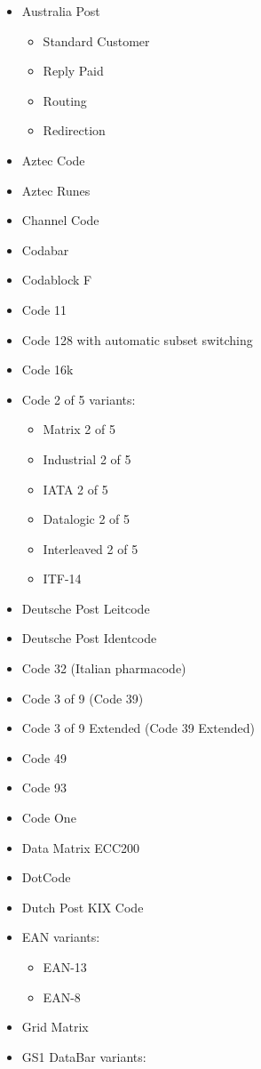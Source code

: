 \begin{itemize}
\tightlist
\item
  Australia Post

  \begin{itemize}
  \tightlist
  \item
    Standard Customer
  \item
    Reply Paid
  \item
    Routing
  \item
    Redirection
  \end{itemize}
\item
  Aztec Code
\item
  Aztec Runes
\item
  Channel Code
\item
  Codabar
\item
  Codablock F
\item
  Code 11
\item
  Code 128 with automatic subset switching
\item
  Code 16k
\item
  Code 2 of 5 variants:

  \begin{itemize}
  \tightlist
  \item
    Matrix 2 of 5
  \item
    Industrial 2 of 5
  \item
    IATA 2 of 5
  \item
    Datalogic 2 of 5
  \item
    Interleaved 2 of 5
  \item
    ITF-14
  \end{itemize}
\item
  Deutsche Post Leitcode
\item
  Deutsche Post Identcode
\item
  Code 32 (Italian pharmacode)
\item
  Code 3 of 9 (Code 39)
\item
  Code 3 of 9 Extended (Code 39 Extended)
\item
  Code 49
\item
  Code 93
\item
  Code One
\item
  Data Matrix ECC200
\item
  DotCode
\item
  Dutch Post KIX Code
\item
  EAN variants:

  \begin{itemize}
  \tightlist
  \item
    EAN-13
  \item
    EAN-8
  \end{itemize}
\item
  Grid Matrix
\item
  GS1 DataBar variants:


\end{itemize}
